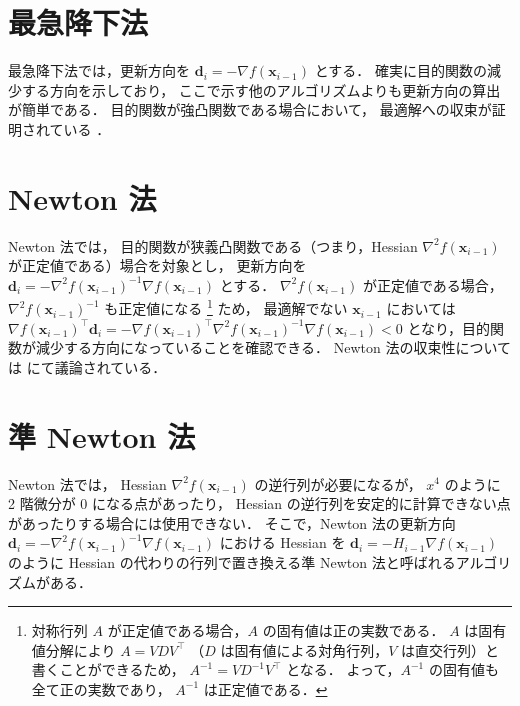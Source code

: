 \section{最急降下法}

最急降下法では，更新方向を $\bm{d}_i = -\nabla f(\bm{x}_{i-1})$ とする．
確実に目的関数の減少する方向を示しており，
ここで示す他のアルゴリズムよりも更新方向の算出が簡単である．
目的関数が強凸関数である場合において，
最適解への収束が証明されている
\cite[Section 9.3.1]{Boyd2004}．

\section{Newton 法}

Newton 法では，
目的関数が狭義凸関数である（つまり，Hessian $\nabla^2 f(\bm{x}_{i-1})$ が正定値である）場合を対象とし，
更新方向を
$\bm{d}_i = -\nabla^2 f(\bm{x}_{i-1})^{-1} \nabla f(\bm{x}_{i-1})$
とする．
$\nabla^2 f(\bm{x}_{i-1})$ が正定値である場合，
$\nabla^2 f(\bm{x}_{i-1})^{-1}$ も正定値になる
\footnote{%
    対称行列 $A$ が正定値である場合，$A$ の固有値は正の実数である．%
    $A$ は固有値分解により $A=VDV^\top$ （$D$ は固有値による対角行列，$V$ は直交行列）と書くことができるため，%
    $A^{-1} = VD^{-1}V^\top$ となる．%
    よって，$A^{-1}$ の固有値も全て正の実数であり，%
    $A^{-1}$ は正定値である．%
}
ため，
最適解でない $\bm{x}_{i-1}$ においては
$\nabla f(\bm{x}_{i-1})^\top \bm{d}_i = -\nabla f(\bm{x}_{i-1})^\top \nabla^2 f(\bm{x}_{i-1})^{-1} \nabla f(\bm{x}_{i-1}) < 0$
となり，目的関数が減少する方向になっていることを確認できる．
Newton 法の収束性については \cite[Section 9.5.3, 9.6.4]{Boyd2004} にて議論されている．

\section{準 Newton 法}

Newton 法では，
Hessian $\nabla^2 f(\bm{x}_{i-1})$ の逆行列が必要になるが，
$x^4$ のように 2 階微分が 0 になる点があったり，
Hessian の逆行列を安定的に計算できない点があったりする場合には使用できない．
そこで，Newton 法の更新方向
$\bm{d}_i = -\nabla^2 f(\bm{x}_{i-1})^{-1} \nabla f(\bm{x}_{i-1})$
における Hessian を
$\bm{d}_i = -H_{i-1} \nabla f(\bm{x}_{i-1})$
のように Hessian の代わりの行列で置き換える準 Newton 法と呼ばれるアルゴリズムがある．

